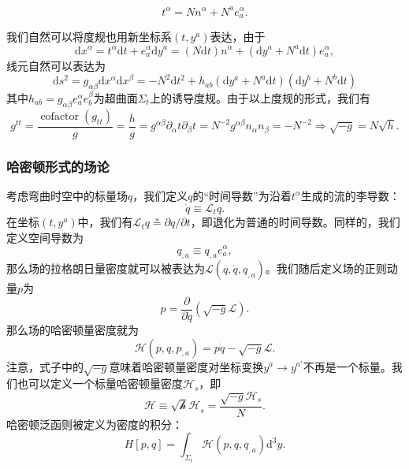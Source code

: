 \documentclass[hyperref, UTF8, a4paper]{ctexart}
\begin{document}
\begin{equation*}
	t^{\alpha } =Nn^{\alpha } +N^{a} e_{a}^{\alpha } .
\end{equation*}

我们自然可以将度规也用新坐标系$(t,y^{a} )$表达，由于
\begin{equation*}
	\mathrm{d} x^{\alpha } =t^{\alpha }\mathrm{d} t+e_{a}^{\alpha }\mathrm{d} y^{a} =(N\mathrm{d} t)n^{\alpha } +(\mathrm{d} y^{a} +N^{a}\mathrm{d} t)e_{a}^{\alpha } ,
\end{equation*}
线元自然可以表达为
\begin{equation*}
	\mathrm{d} s^{2} =g_{\alpha \beta }\mathrm{d} x^{\alpha }\mathrm{d} x^{\beta } =-N^{2}\mathrm{d} t^{2} +h_{ab} (\mathrm{d} y^{a} +N^{a}\mathrm{d} t)(\mathrm{d} y^{b} +N^{b}\mathrm{d} t)
\end{equation*}
其中$h_{ab} =g_{\alpha \beta } e_{a}^{\alpha } e_{b}^{\beta }$为超曲面$\Sigma _{t}$上的诱导度规。由于以上度规的形式，我们有
\begin{equation*}
	g^{tt} =\frac{\operatorname{cofactor}( g_{tt})}{g} =\frac{h}{g} =g^{\alpha \beta } \partial _{\alpha } t\partial _{\beta } t=N^{-2} g^{\alpha \beta } n_{\alpha } n_{\beta } =-N^{-2} \Rightarrow \boxed{\sqrt{-g} =N\sqrt{h}} .
\end{equation*}
\subsubsection{哈密顿形式的场论}

考虑弯曲时空中的标量场$q$，我们定义$q$的“时间导数”为沿着$t^{\alpha }$生成的流的李导数：
\begin{equation*}
	\dot{q} \equiv \mathcal{L}_{t} q.
\end{equation*}
在坐标$(t,y^{a} )$中，我们有$\mathcal{L}_{t} q\stackrel{*}{=} \partial q/\partial t$，即退化为普通的时间导数。同样的，我们定义空间导数为
\begin{equation*}
	q_{,a} \equiv q_{,a} e_{a}^{\alpha } ,
\end{equation*}
那么场的拉格朗日量密度就可以被表达为$\mathcal{L} (q,\dot{q} ,q_{,a} )$。我们随后定义场的正则动量$p$为
\begin{equation*}
	p=\frac{\partial }{\partial \dot{q}}\left(\sqrt{-g}\mathcal{L}\right) .
\end{equation*}
那么场的哈密顿量密度就为
\begin{equation*}
	\mathcal{H} (p,q,p_{,a} )=p\dot{q} -\sqrt{-g}\mathcal{L} .
\end{equation*}
注意，式子中的$\sqrt{-g}$意味着哈密顿量密度对坐标变换$y^{a}\rightarrow y^{a'}$不再是一个标量。我们也可以定义一个标量哈密顿量密度$\mathcal{H}_{s}$，即
\begin{equation*}
	\mathcal{H} \equiv \mathcal{\sqrt{h} H}_{s} =\frac{\sqrt{-g}\mathcal{H}_{s}}{N} .
\end{equation*}
哈密顿泛函则被定义为密度的积分：
\begin{equation*}
	H[ p,q] =\int _{\Sigma _{t}}\mathcal{H} (p,q,q_{,a} )\mathrm{d}^{3} y.
\end{equation*}
\end{document}
